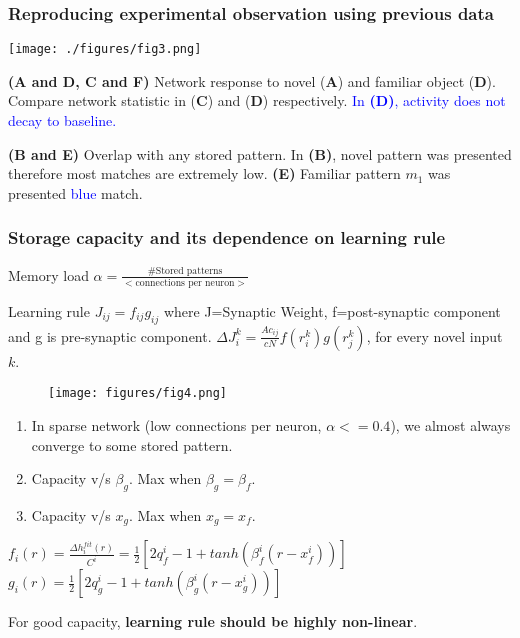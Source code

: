\documentclass{beamer}
\newcommand\Panel[1]{\textbf{(#1)}}
\begin{document}
\begin{frame}
    \frametitle{Reproducing experimental observation using previous data}

    \texttt{[image: ./figures/fig3.png]}

    {\tiny {\bf (A and D, C and F)} Network response to novel (\textbf{A}) and familiar object
        (\textbf{D}). Compare network statistic in (\textbf{C}) and (\textbf{D})
        respectively. \textcolor{blue}{In \Panel{D}, activity does not decay to
        baseline.}

        {\bf (B and E)} Overlap with any stored pattern. In \Panel{B}, novel
        pattern was presented therefore most matches are extremely low.
        \Panel{E} Familiar pattern $m_1$ was presented \textcolor{blue}{blue} match.
    }
    
\end{frame}

\begin{frame}
    \frametitle{Storage capacity and its dependence on learning rule}

    {\tiny 
    Memory load $\alpha=\frac{\#\text{Stored patterns}}{<\text{connections per neuron}>}$ 

    Learning rule $J_{ij}=f_{ij}g_{ij}$ where J=Synaptic Weight, f=post-synaptic
    component and g is pre-synaptic component. 
    $\Delta J_i^k=\frac{Ac_{ij}}{cN}f(r_i^k)g(r_j^k)$, for every novel input $k$.
    }

\begin{figure}[ht!]
    \centering
    \texttt{[image: figures/fig4.png]}\label{fig:4}
\end{figure}

\begin{enumerate}[label=(\Alph*)]
    \tiny
    \item In sparse network (low connections per neuron, $\alpha <= 0.4$), 
        we almost always converge to some stored pattern.
    \item Capacity v/s $\beta_g$. Max when $\beta_g =\beta_f$.
    \item Capacity v/s $x_g$. Max when $x_g=x_f$. 
\end{enumerate}
{\tiny $f_i(r)=\frac{\Delta h_i^{fit}(r)}{C^i}=\frac{1}{2}\left[2q_f^i - 1+tanh(\beta_f^i(r-x_f^i))\right]$ }
{\tiny $g_i(r)=\frac{1}{2}\left[2q_g^i - 1+tanh(\beta_g^i(r-x_g^i))\right]$ }

{\footnotesize 
    For good capacity, \textbf{learning rule should be highly non-linear}.
}
\end{frame}
\end{document}

